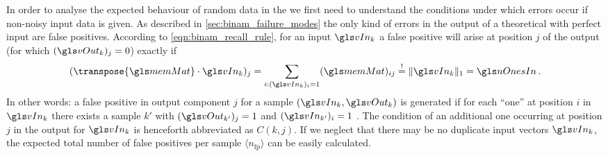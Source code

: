 In order to analyse the expected behaviour of random data in the \BiNAM we first need to understand the conditions under which errors occur if non-noisy input data is given. As described in \cref{sec:binam_failure_modes} the only kind of errors in the output of a theoretical \BiNAM with perfect input are false positives. According to \cref{eqn:binam_recall_rule}, for an input \(\vIn_k\) a false positive will arise at position $j$ of the output (for which \((\vOut_k)_j = 0\)) exactly if
\begin{align}
	(\transpose{\memMat} \cdot \vIn_k)_j = \sum_{i : (\vIn_k)_i = 1} (\memMat)_{ij} \overset{!}= \|\vIn_{k}\|_1 = \nOnesIn \,.
	\label{eqn:binam_false_positive_condition}
\end{align}
In other words: a false positive in output component $j$ for a sample $(\vIn_k, \vOut_k)$ is generated if for each \enquote{one} at position \(i\) in \(\vIn_k\) there exists a sample $k'$ with \((\vOut_{k'})_j = 1\) and \((\vIn_{k'})_i = 1\) \cite{palm1980associative}. The condition of an additional one occurring at position $j$ in the output for \(\vIn_k\) is henceforth abbreviated as \(C(k, j)\). If we neglect that there may be no duplicate input vectors \(\vIn_k\), the expected total number of false positives per sample \(\langle n_{\mathrm{fp}} \rangle\) can be easily calculated.

